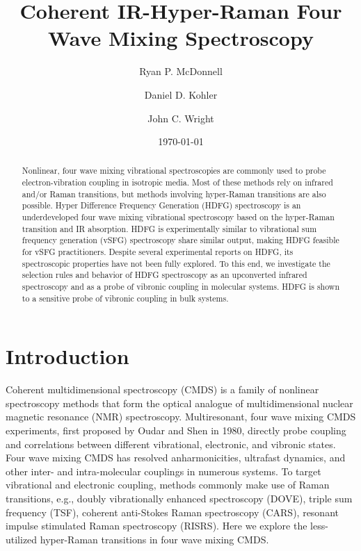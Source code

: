 \documentclass[aip, jcp, reprint, onecolumn, nofootinbib]{revtex4-2}
\begin{document}
\title{Coherent IR-Hyper-Raman Four Wave Mixing Spectroscopy}


\author{Ryan P. McDonnell} 
\author{Daniel D. Kohler}
\author{John C. Wright} 


\date{\today}

\begin{abstract}
Nonlinear, four wave mixing vibrational spectroscopies are commonly used to probe electron-vibration coupling in isotropic media.
Most of these methods rely on infrared and/or Raman transitions, but methods involving hyper-Raman transitions are also possible. 
Hyper Difference Frequency Generation (HDFG) spectroscopy is an underdeveloped four wave mixing vibrational spectroscopy based on the hyper-Raman transition and IR absorption. 
HDFG is experimentally similar to vibrational sum frequency generation (vSFG) spectroscopy share similar output, making HDFG feasible for vSFG practitioners. 
Despite several experimental reports on HDFG, its spectroscopic properties have not been fully explored. 
To this end, we investigate the selection rules and behavior of HDFG spectroscopy as an upconverted infrared spectroscopy and as a probe of vibronic coupling in molecular systems.
HDFG is shown to a sensitive probe of vibronic coupling in bulk systems.
\end{abstract}

\maketitle

\section{Introduction}
Coherent multidimensional spectroscopy (CMDS) is a family of nonlinear spectroscopy methods that form the optical analogue of multidimensional nuclear magnetic resonance (NMR) spectroscopy.\cite{Cho2008}
Multiresonant, four wave mixing CMDS experiments, first proposed by Oudar and Shen in 1980,\cite{RN307} directly probe coupling and correlations between different vibrational, electronic, and vibronic states. \cite{RN281, RN103, Cho2008} 
Four wave mixing CMDS has resolved anharmonicities, ultrafast dynamics, and other inter- and intra-molecular couplings in numerous systems. \cite{Cho2008, Gaynor2017, Ziegler2018, Ogilvie2019, Bonn2021, RN325, Chen2024}
To target vibrational and electronic coupling, methods commonly make use of Raman transitions, e.g., doubly vibrationally enhanced spectroscopy (DOVE), triple sum frequency (TSF), coherent anti-Stokes Raman spectroscopy (CARS), resonant impulse stimulated Raman spectroscopy (RISRS).\cite{RN103, Dhar1994, RN345, Cho2000, RN491}
Here we explore the less-utilized hyper-Raman transitions in four wave mixing CMDS.
\end{document}
